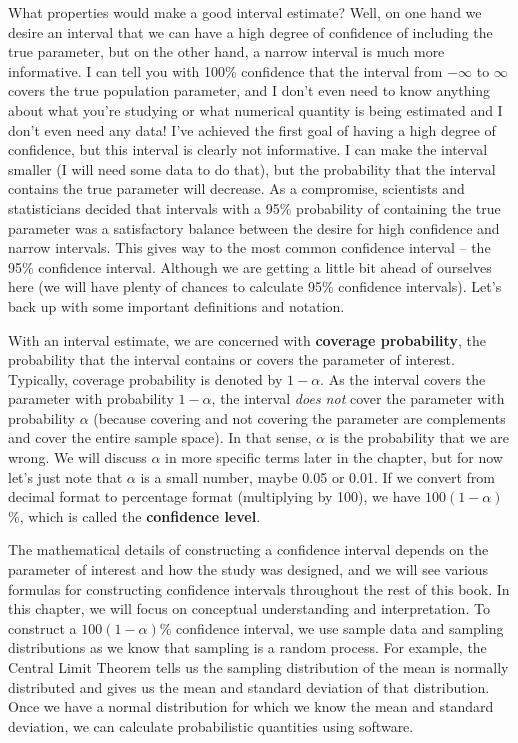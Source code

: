 \documentclass[
]{book}
\theoremstyle{definition}
\theoremstyle{definition}
\theoremstyle{definition}
\theoremstyle{remark}
\begin{document}
What properties would make a good interval estimate? Well, on one hand we desire an interval that we can have a high degree of confidence of including the true parameter, but on the other hand, a narrow interval is much more informative. I can tell you with 100\% confidence that the interval from \(-\infty\) to \(\infty\) covers the true population parameter, and I don't even need to know anything about what you're studying or what numerical quantity is being estimated and I don't even need any data! I've achieved the first goal of having a high degree of confidence, but this interval is clearly not informative. I can make the interval smaller (I will need some data to do that), but the probability that the interval contains the true parameter will decrease. As a compromise, scientists and statisticians decided that intervals with a 95\% probability of containing the true parameter was a satisfactory balance between the desire for high confidence and narrow intervals. This gives way to the most common confidence interval -- the 95\% confidence interval. Although we are getting a little bit ahead of ourselves here (we will have plenty of chances to calculate 95\% confidence intervals). Let's back up with some important definitions and notation.

With an interval estimate, we are concerned with \textbf{coverage probability}, the probability that the interval contains or covers the parameter of interest. Typically, coverage probability is denoted by \(1 - \alpha\). As the interval covers the parameter with probability \(1 - \alpha\), the interval \emph{does not} cover the parameter with probability \(\alpha\) (because covering and not covering the parameter are complements and cover the entire sample space). In that sense, \(\alpha\) is the probability that we are wrong. We will discuss \(\alpha\) in more specific terms later in the chapter, but for now let's just note that \(\alpha\) is a small number, maybe 0.05 or 0.01. If we convert from decimal format to percentage format (multiplying by 100), we have \(100(1 - \alpha)\)\%, which is called the \textbf{confidence level}.

The mathematical details of constructing a confidence interval depends on the parameter of interest and how the study was designed, and we will see various formulas for constructing confidence intervals throughout the rest of this book. In this chapter, we will focus on conceptual understanding and interpretation. To construct a \(100(1 - \alpha)\)\% confidence interval, we use sample data and sampling distributions as we know that sampling is a random process. For example, the Central Limit Theorem tells us the sampling distribution of the mean is normally distributed and gives us the mean and standard deviation of that distribution. Once we have a normal distribution for which we know the mean and standard deviation, we can calculate probabilistic quantities using software.
\end{document}
